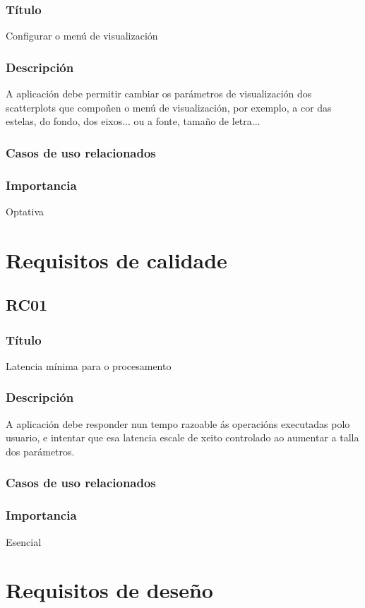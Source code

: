 \subsubsection{Título}
Configurar o menú de visualización
\subsubsection{Descripción}
A aplicación debe permitir cambiar os parámetros de visualización dos scatterplots que compoñen o menú de visualización, por exemplo, a cor das estelas, do fondo, dos eixos... ou a fonte, tamaño de letra...
\subsubsection{Casos de uso relacionados}
\subsubsection{Importancia}
Optativa

\section{Requisitos de calidade}

\subsection*{RC01}
\subsubsection{Título}
Latencia mínima para o procesamento
\subsubsection{Descripción}
A aplicación debe responder nun tempo razoable ás operacións executadas polo usuario, e intentar que esa latencia escale de xeito controlado ao aumentar a talla dos parámetros.
\subsubsection{Casos de uso relacionados}
\subsubsection{Importancia}
Esencial

\section{Requisitos de deseño}

